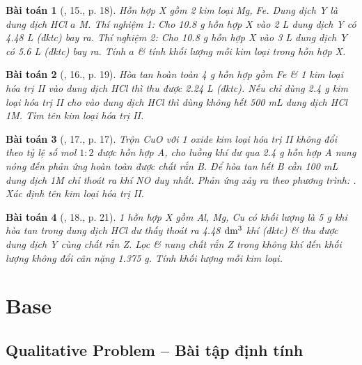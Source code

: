 \documentclass{article}
\newtheorem{baitoan}{Bài toán}
\begin{document}
\begin{baitoan}[\cite{An_350_BT_Hoa_Hoc_9}, 15., p. 18]
	Hỗn hợp X gồm 2 kim loại \emph{Mg, Fe}. Dung dịch Y là dung dịch \emph{HCl $a$ M}. Thí nghiệm 1: Cho \emph{10.8 g} hỗn hợp X vào \emph{2 L} dung dịch Y có \emph{4.48 L } (đktc) bay ra. Thí nghiệm 2: Cho \emph{10.8 g} hỗn hợp X vào \emph{3 L} dung dịch Y có \emph{5.6 L } (đktc) bay ra. Tính $a$ \& tính khối lượng mỗi kim loại trong hỗn hợp X.
\end{baitoan}

\begin{baitoan}[\cite{An_350_BT_Hoa_Hoc_9}, 16., p. 19]
	Hòa tan hoàn toàn \emph{4 g} hỗn hợp gồm \emph{Fe} \& 1 kim loại hóa trị II vào dung dịch \emph{HCl} thì thu được \emph{2.24 L } (đktc). Nếu chỉ dùng \emph{2.4 g} kim loại hóa trị II cho vào dung dịch \emph{HCl} thì dùng không hết \emph{500 mL} dung dịch \emph{HCl 1M}. Tìm tên kim loại hóa trị II.
\end{baitoan}

\begin{baitoan}[\cite{An_350_BT_Hoa_Hoc_9}, 17., p. 17]
	Trộn \emph{CuO} với 1 oxide kim loại hóa trị II không đổi theo tỷ lệ số mol $1:2$ được hỗn hợp A, cho luồng khí \emph{} dư qua \emph{2.4 g} hỗn hợp A nung nóng đến phản ứng hoàn toàn được chất rắn B. Để hòa tan hết B cần \emph{100 mL} dung dịch \emph{ 1M} chỉ thoát ra khí \emph{NO} duy nhất. Phản ứng xảy ra theo phương trình: \emph{}. Xác định tên kim loại hóa trị II.
\end{baitoan}

\begin{baitoan}[\cite{An_350_BT_Hoa_Hoc_9}, 18., p. 21]
	1 hỗn hợp X gồm \emph{Al, Mg, Cu} có khối lượng là \emph{5 g} khi hòa tan trong dung dịch \emph{HCl} dư thấy thoát ra \emph{4.48 $\rm dm^3$} khí (đktc) \& thu được dung dịch Y cùng chất rắn Z. Lọc \& nung chất rắn Z trong không khí đến khối lượng không đổi cân nặng \emph{1.375 g}. Tính khối lượng mỗi kim loại.
\end{baitoan}


\section{Base}

\subsection{Qualitative Problem -- Bài tập định tính}
\end{document}
